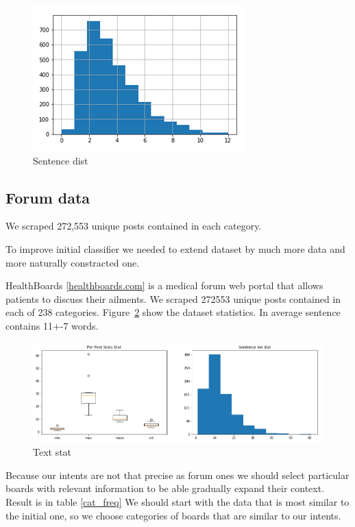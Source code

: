 \documentclass[11pt]{article}
\begin{document}
 \begin{figure}[h]
 	\centering
 	\includegraphics[scale=0.4]{report4.png}
	\caption{Sentence dist}
 \label{words_freq}
 \end{figure}
 \FloatBarrier



\subsection{Forum data}

We scraped 272,553 unique posts contained in each category. 

To improve initial classifier we needed to extend dataset by much more data and more naturally constracted one.


HealthBoards \ref{healthboards.com} is a medical forum web portal that allows patients to discuss their ailments. We scraped 272553 unique posts contained in each of 238 categories. Figure~\ref{forum_data_stat} show the dataset statistics. In average sentence contains 11+-7 words.


 \begin{figure}[h]
 	\centering
 	\includegraphics[scale=0.4]{report3.png}
	\caption{Text stat}\label{forum_data_stat}
 \end{figure}
\FloatBarrier


Because our intents are not that precise as forum ones we should select particular boards with relevant information to be able gradually expand their context. Result is in table \ref{cat_freq} 
We should start with the data that is most similar to the initial one, so we choose categories of boards that are similar to our intents. 
\end{document}
